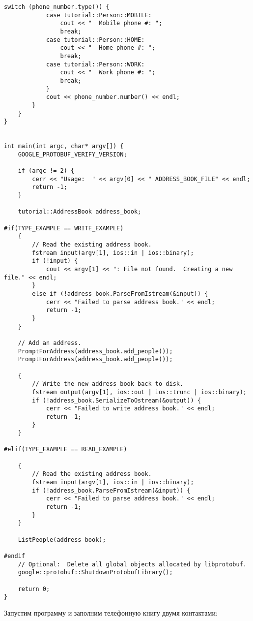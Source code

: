 \begin{lstlisting}[style=CodeListing, label=code:proto_utility, caption={Утилита для работы с protobuf-сообщениями}]
            switch (phone_number.type()) {
            case tutorial::Person::MOBILE:
                cout << "  Mobile phone #: ";
                break;
            case tutorial::Person::HOME:
                cout << "  Home phone #: ";
                break;
            case tutorial::Person::WORK:
                cout << "  Work phone #: ";
                break;
            }
            cout << phone_number.number() << endl;
        }
    }
}


int main(int argc, char* argv[]) {
    GOOGLE_PROTOBUF_VERIFY_VERSION;

    if (argc != 2) {
        cerr << "Usage:  " << argv[0] << " ADDRESS_BOOK_FILE" << endl;
        return -1;
    }

    tutorial::AddressBook address_book;

#if(TYPE_EXAMPLE == WRITE_EXAMPLE)
    {
        // Read the existing address book.
        fstream input(argv[1], ios::in | ios::binary);
        if (!input) {
            cout << argv[1] << ": File not found.  Creating a new file." << endl;
        }
        else if (!address_book.ParseFromIstream(&input)) {
            cerr << "Failed to parse address book." << endl;
            return -1;
        }
    }

    // Add an address.
    PromptForAddress(address_book.add_people());
    PromptForAddress(address_book.add_people());

    {
        // Write the new address book back to disk.
        fstream output(argv[1], ios::out | ios::trunc | ios::binary);
        if (!address_book.SerializeToOstream(&output)) {
            cerr << "Failed to write address book." << endl;
            return -1;
        }
    }

#elif(TYPE_EXAMPLE == READ_EXAMPLE)

    {
        // Read the existing address book.
        fstream input(argv[1], ios::in | ios::binary);
        if (!address_book.ParseFromIstream(&input)) {
            cerr << "Failed to parse address book." << endl;
            return -1;
        }
    }

    ListPeople(address_book);

#endif
    // Optional:  Delete all global objects allocated by libprotobuf.
    google::protobuf::ShutdownProtobufLibrary();

    return 0;
}
\end{lstlisting}

Запустим программу и заполним телефонную книгу двумя контактами:

